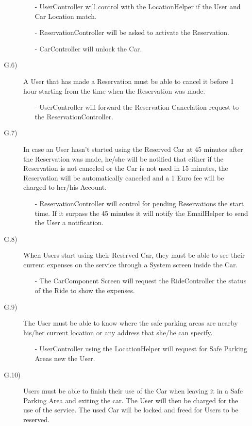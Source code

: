 \documentclass[a4paper]{article}
\begin{document}
\begin{description}
\begin{itemize}
	\item[-]UserController will control with the LocationHelper if the User and Car Location match.
	\item[-]ReservationController will be asked to activate the Reservation.
	\item[-]CarController will unlock the Car.	
\end{itemize}
\newpage
\item [G.6)]A User that has made a Reservation must be able to cancel it before 1 hour starting from the time when the Reservation was made.
\begin{itemize}
	\item[-]UserController will forward the Reservation Cancelation request to the ReservationController.
\end{itemize}
\item [G.7)]In case an User hasn't started using the Reserved Car at 45 minutes after the Reservation was made, he/she will be notified that either if the Reservation is not canceled or the Car is not used in 15 minutes, the Reservation will be automatically canceled and a 1 Euro fee will be charged to her/his Account.
\begin{itemize}
	\item[-]ReservationController will control for pending Reservations the start time. If it surpass the 45 minutes it will notify the EmailHelper to send the User a notification.
\end{itemize}
\item [G.8)]When Users start using their Reserved Car, they must be able to see their current expenses on the service through a System screen inside the Car.
\begin{itemize}
	\item[-]The CarComponent Screen will request the RideController the status of the Ride to show the expenses.
\end{itemize}
\item [G.9)]The User must be able to know where the safe parking areas are nearby his/her current location or any address that she/he can specify.
\begin{itemize}
	\item[-]UserController using the LocationHelper will request for Safe Parking Areas new the User.
\end{itemize}
\item [G.10)]Users must be able to finish their use of the Car when leaving it in a Safe Parking Area and exiting the car. The User will then be charged for the use of the service. The used Car will be locked and freed for Users to be reserved.

\end{description}
\end{document}
